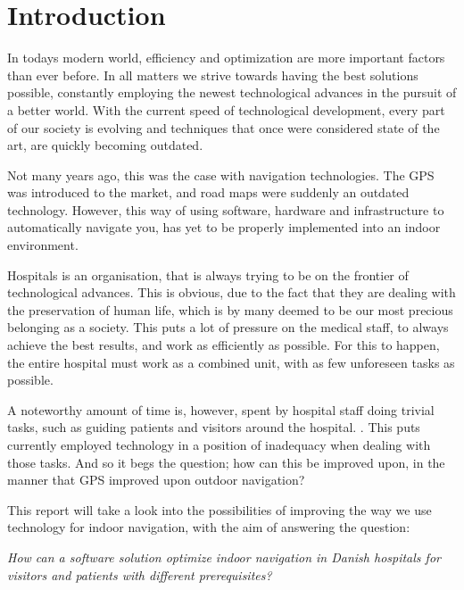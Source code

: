 \chapter{Introduction}\label{intro}

In todays modern world, efficiency and optimization are more important factors than ever before. In all matters we strive towards having the best solutions possible, constantly employing the newest technological advances in the pursuit of a better world. With the current speed of technological development, every part of our society is evolving and techniques that once were considered state of the art, are quickly becoming outdated.

Not many years ago, this was the case with navigation technologies. The GPS was introduced to the market, and road maps were suddenly an outdated technology. However, this way of using software, hardware and infrastructure to automatically navigate you, has yet to be properly implemented into an indoor environment.

Hospitals is an organisation, that is always trying to be on the frontier of technological advances. This is obvious, due to the fact that they are dealing with the preservation of human life, which is by many deemed to be our most precious belonging as a society. This puts a lot of pressure on the medical staff, to always achieve the best results, and work as efficiently as possible. For this to happen, the entire hospital must work as a combined unit, with as few unforeseen tasks as possible.

A noteworthy amount of time is, however, spent by hospital staff doing trivial tasks, such as guiding patients and visitors around the hospital. \cite{findvejintro} \cite{timewaste}. This puts currently employed technology in a position of inadequacy when dealing with those tasks. And so it begs the question; how can this be improved upon, in the manner that GPS improved upon outdoor navigation?

This report will take a look into the possibilities of improving the way we use technology for indoor navigation, with the aim of answering the question:

\textit{How can a software solution optimize indoor navigation in Danish hospitals for visitors and patients with different prerequisites?}\label{sub:init}



